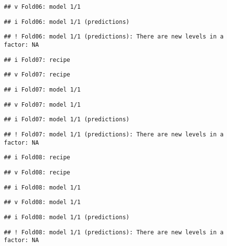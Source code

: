 \documentclass[
]{article}
\begin{document}
\begin{verbatim}
## v Fold06: model 1/1
\end{verbatim}

\begin{verbatim}
## i Fold06: model 1/1 (predictions)
\end{verbatim}

\begin{verbatim}
## ! Fold06: model 1/1 (predictions): There are new levels in a factor: NA
\end{verbatim}

\begin{verbatim}
## i Fold07: recipe
\end{verbatim}

\begin{verbatim}
## v Fold07: recipe
\end{verbatim}

\begin{verbatim}
## i Fold07: model 1/1
\end{verbatim}

\begin{verbatim}
## v Fold07: model 1/1
\end{verbatim}

\begin{verbatim}
## i Fold07: model 1/1 (predictions)
\end{verbatim}

\begin{verbatim}
## ! Fold07: model 1/1 (predictions): There are new levels in a factor: NA
\end{verbatim}

\begin{verbatim}
## i Fold08: recipe
\end{verbatim}

\begin{verbatim}
## v Fold08: recipe
\end{verbatim}

\begin{verbatim}
## i Fold08: model 1/1
\end{verbatim}

\begin{verbatim}
## v Fold08: model 1/1
\end{verbatim}

\begin{verbatim}
## i Fold08: model 1/1 (predictions)
\end{verbatim}

\begin{verbatim}
## ! Fold08: model 1/1 (predictions): There are new levels in a factor: NA
\end{verbatim}
\end{document}
